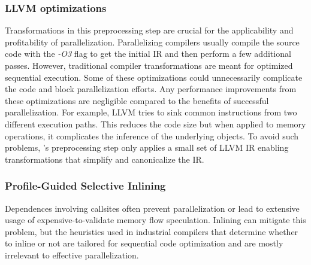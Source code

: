 \subsubsection{LLVM optimizations}

Transformations in this preprocessing step are crucial for the
applicability and profitability of parallelization.
%
Parallelizing compilers usually compile the source code with the \textit{-O3}
flag to get the initial IR and then perform a few additional
passes.
However, traditional compiler transformations are meant for optimized
sequential execution.
%
Some of these optimizations could unnecessarily complicate the code
and block parallelization efforts.
%
Any performance improvements from these optimizations are negligible
compared to the benefits of successful parallelization.
%
For example, LLVM tries to sink common instructions from two different
execution paths. This reduces the code size but when applied to memory
operations, it complicates the inference of the underlying objects.
%
To avoid such problems, \namensp 's preprocessing step only applies a
small set of LLVM IR enabling transformations that simplify and
canonicalize the IR.



\subsubsection{Profile-Guided Selective Inlining}

%
Dependences involving callsites often prevent parallelization or lead
to extensive usage of expensive-to-validate memory flow speculation.
%
Inlining can mitigate this problem, but the heuristics used in
industrial compilers that determine whether to inline or not are tailored
for sequential code optimization and are mostly irrelevant to
effective parallelization.
%
%
%

